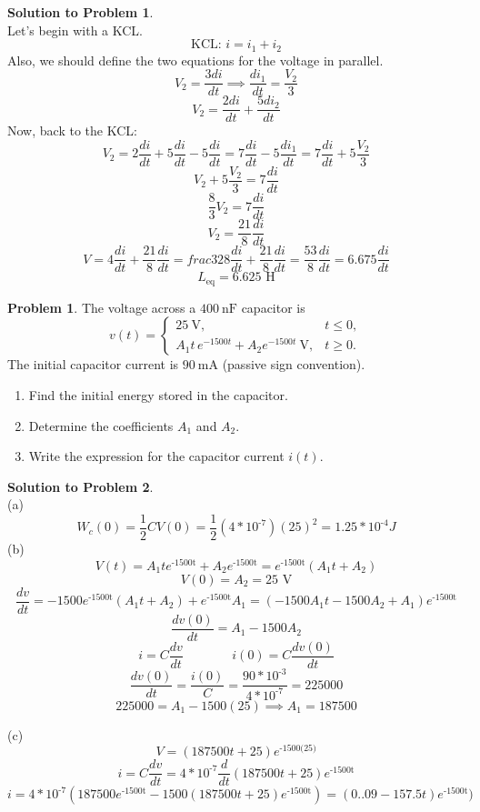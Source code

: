 \documentclass[11pt,letterpaper]{article}
\theoremstyle{definition}
\newtheorem{prob}{\textcolor{problemcolor}{Problem}}  %
\newtheorem{solprob}{\textcolor{solproblemcolor}{Solution to Problem}}  %
\begin{document}
\begin{solprob} \text{}\\
    Let's begin with a KCL.
    \[\text{KCL: } i=i_1+i_2\]
    Also, we should define the two equations for the voltage in parallel.
    \[V_2=\frac{3di}{dt}\implies\frac{di_1}{dt} =\frac{V_2}{3}\]
    \[V_2=\frac{2di}{dt}+\frac{5di_2}{dt}\]
    Now, back to the KCL:
    \[V_2=2\frac{di}{dt}+5\frac{di}{dt}-5\frac{di}{dt}=7\frac{di}{dt}-5\frac{di_1}{dt}=7\frac{di}{dt}+5\frac{V_2}{3}\]
    \[V_2+5\frac{V_2}{3}=7\frac{di}{dt}\]
    \[\frac{8}{3}V_2=7\frac{di}{dt}\]
    \[V_2=\frac{21}{8}\frac{di}{dt}\]
    \[V=4\frac{di}{dt}+\frac{21}{8}\frac{di}{dt}=frac{32}{8}\frac{di}{dt}+\frac{21}{8}\frac{di}{dt}=\frac{53}{8}\frac{di}{dt}=6.675\frac{di}{dt}\]
    \[L_\text{eq}=6.625 \text{ H}\]
\end{solprob}

\noindent\makebox[\linewidth]{\color{rouge_poly}{\rule{\textwidth}{1.3pt}}}	

\begin{prob}\label{pb:CapPiecewise}\text{}
	The voltage across a $400~\text{nF}$ capacitor is
	\[
	v(t)=
	\begin{cases}
		25~\text{V}, & t\le 0,\\[2mm]
		A_1 t\,e^{-1500t}+A_2 e^{-1500t}\ \text{V}, & t\ge 0.
	\end{cases}
	\]
	The initial capacitor current is $90~\text{mA}$ (passive sign convention).
	
	\begin{enumerate}[label=(\alph*)]
		\item Find the initial energy stored in the capacitor.
		\item Determine the coefficients $A_1$ and $A_2$.
		\item Write the expression for the capacitor current $i(t)$.
	\end{enumerate}
\end{prob}

\noindent\makebox[\linewidth]{\color{rouge_poly}{\rule{\textwidth}{1.3pt}}}

\begin{solprob} \text{}\\
    (a) \[W_c(0)=\frac{1}{2}CV(0) = \frac{1}{2}(4*10^\text{-7})(25)^2=1.25*10^\text{-4} J\]
    (b)
    \[V(t)=A_1te^\text{-1500t}+A_2e^\text{-1500t}=e^\text{-1500t}(A_1t+A_2)\]
    \[V(0)=A_2=25\text{ V}\]
    \[\frac{dv}{dt}=-1500e^\text{-1500t}(A_1t+A_2) + e^\text{-1500t}A_1=(-1500A_1t-1500A_2+A_1)e^\text{-1500t}\]
    \[\frac{dv(0)}{dt} = A_1-1500A_2\]
    \[i=C\frac{dv}{dt} \,\,\,\,\,\,\,\,\,\,\,\,\,\,\,\,\,\,\,\,\,\,\,i(0)=C\frac{dv(0)}{dt}\]
    \[\frac{dv(0)}{dt}=\frac{i(0)}{C}=\frac{90*10^\text{-3}}{4*10^\text{-7}}=225000\]
    \[225000 = A_1-1500(25) \implies A_1 = 187500\]

    (c)\[V=(187500t+25)e^\text{-1500(25)}\]
    \[i=C\frac{dv}{dt}=4*10^\text{-7}\frac{d}{dt}(187500t+25)e^\text{-1500t}\]
    \[i=4*10^\text{-7}(187500e^\text{-1500t}-1500(187500t+25)e^\text{-1500t})=(0..09-157.5t)e^\text{-1500t})\]
    
\end{solprob}
\end{document}
